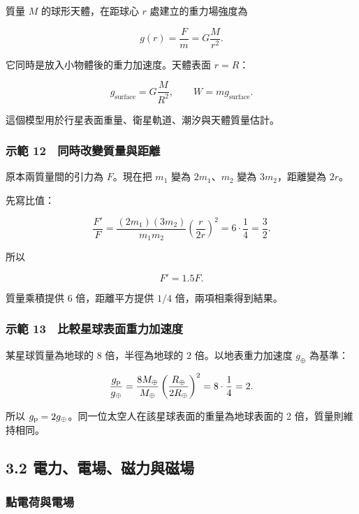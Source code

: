 \documentclass[11pt,a4paper]{article}
\begin{document}
質量 \(M\) 的球形天體，在距球心 \(r\) 處建立的重力場強度為

\[
g(r)=\frac{F}{m}=G\frac{M}{r^2}.
\]

它同時是放入小物體後的重力加速度。天體表面 \(r=R\)：

\[
g_{\text{surface}}=G\frac{M}{R^2},\qquad W=mg_{\text{surface}}.
\]

這個模型用於行星表面重量、衛星軌道、潮汐與天體質量估計。

\subsubsection{示範 12　同時改變質量與距離}\label{ux793aux7bc4-12-ux540cux6642ux6539ux8b8aux8ceaux91cfux8207ux8dddux96e2}

原本兩質量間的引力為 \(F\)。現在把 \(m_1\) 變為 \(2m_1\)、\(m_2\) 變為 \(3m_2\)，距離變為 \(2r\)。

先寫比值：

\[
\frac{F'}{F}
=\frac{(2m_1)(3m_2)}{m_1m_2}
\left(\frac{r}{2r}\right)^2
=6\cdot\frac{1}{4}=\frac{3}{2}.
\]

所以

\[
F'=1.5F.
\]

質量乘積提供 6 倍，距離平方提供 \(1/4\) 倍，兩項相乘得到結果。

\subsubsection{示範 13　比較星球表面重力加速度}\label{ux793aux7bc4-13-ux6bd4ux8f03ux661fux7403ux8868ux9762ux91cdux529bux52a0ux901fux5ea6}

某星球質量為地球的 \(8\) 倍，半徑為地球的 \(2\) 倍。以地表重力加速度 \(g_\oplus\) 為基準：

\[
\frac{g_{\text p}}{g_\oplus}
=\frac{8M_\oplus}{M_\oplus}
\left(\frac{R_\oplus}{2R_\oplus}\right)^2
=8\cdot\frac{1}{4}=2.
\]

所以 \(g_{\text p}=2g_\oplus\)。同一位太空人在該星球表面的重量為地球表面的 2 倍，質量則維持相同。

\clearpage

\subsection{3.2 電力、電場、磁力與磁場}\label{ux96fbux529bux96fbux5834ux78c1ux529bux8207ux78c1ux5834}

\subsubsection{點電荷與電場}\label{ux9edeux96fbux8377ux8207ux96fbux5834}
\end{document}
